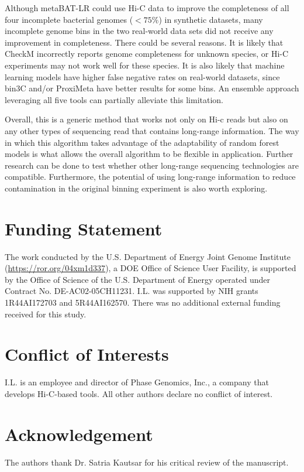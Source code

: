 \documentclass[fleqn,10pt,lineno]{wlpeerj}
\begin{document}
Although metaBAT-LR could use Hi-C data to improve the completeness of all four incomplete bacterial genomes ($<75\%$) in synthetic datasets, many incomplete genome bins in the two real-world data sets did not receive any improvement in completeness. There could be several reasons. It is likely that CheckM incorrectly reports genome completeness for unknown species, or Hi-C experiments may not work well for these species. It is also likely that machine learning models have higher false negative rates on real-world datasets, since bin3C and/or ProxiMeta have better results for some bins. An ensemble approach leveraging all five tools can partially alleviate this limitation.  

Overall, this is a generic method that works not only on Hi-c reads but also on any other types of sequencing read that contains long-range information. The way in which this algorithm takes advantage of the adaptability of random forest models is what allows the overall algorithm to be flexible in application. Further research can be done to test whether other long-range sequencing technologies are compatible. Furthermore, the potential of using long-range information to reduce contamination in the original binning experiment is also worth exploring.   

\section*{Funding Statement}
The work conducted by the U.S. Department of Energy Joint Genome Institute (\url{https://ror.org/04xm1d337}), a DOE Office of Science User Facility, is supported by the Office of Science of the U.S. Department of Energy operated under Contract No. DE-AC02-05CH11231. I.L. was supported by NIH grants 1R44AI172703 and 5R44AI162570. There was no additional external funding received for this study.

\section*{Conflict of Interests}
I.L. is an employee and director of Phase Genomics, Inc., a company that develops Hi-C-based tools. All other authors declare no conflict of interest.

\section*{Acknowledgement}
The authors thank Dr. Satria Kautsar for his critical review of the manuscript. 


\end{document}
